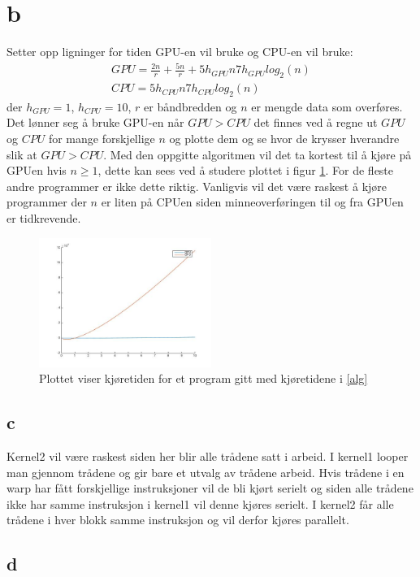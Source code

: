 \documentclass[12pt, a4paper]{article} %
\begin{document}
\section*{b}
Setter opp ligninger for tiden GPU-en vil bruke og CPU-en vil bruke:
\begin{align}
GPU=\frac{2n}{r}+\frac{5n}{r}+5h_{GPU}n7h_{GPU}log_2(n) \nonumber \\
CPU=5h_{CPU}n7h_{CPU}log_2(n)
\label{alg}
\end{align}
der $h_{GPU}=1$, $h_{CPU}=10$, $r$ er båndbredden og $n$ er mengde data som overføres. Det lønner seg å bruke GPU-en når $GPU>CPU$ det finnes ved å regne ut $GPU$ og $CPU$ for mange forskjellige $n$ og plotte dem og se hvor de krysser hverandre slik at $GPU>CPU$.
 Med den oppgitte algoritmen vil det ta kortest til å kjøre på GPUen hvis $n \geqslant 1$, dette kan sees ved å studere plottet i figur \ref{GPU-CPU}. For de fleste andre programmer er ikke dette riktig. Vanligvis vil det være raskest å kjøre programmer der $n$ er liten på CPUen siden minneoverføringen til og fra GPUen er tidkrevende. 
\begin{figure}
\centering
\includegraphics[width=0.5\textwidth]{GPU-CPU.jpg} 
\caption{Plottet viser kjøretiden for et program gitt med kjøretidene i \eqref{alg}}
\label{GPU-CPU}
\end{figure}

\subsection*{c}
Kernel2 vil være raskest siden her blir alle trådene satt i arbeid. I kernel1 looper man gjennom trådene og gir bare et utvalg av trådene arbeid. Hvis trådene i en warp har fått forskjellige instruksjoner vil de bli kjørt serielt og siden alle trådene ikke har samme instruksjon i kernel1 vil denne kjøres serielt. I kernel2 får alle trådene i hver blokk samme instruksjon og vil derfor kjøres parallelt.

\subsection*{d}
\end{document}
